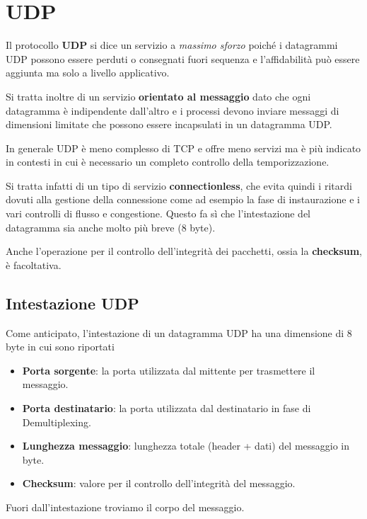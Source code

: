 \section{UDP}
Il protocollo \textbf{UDP} si dice un servizio a \emph{massimo sforzo} 
poiché i datagrammi UDP possono essere perduti o consegnati fuori 
sequenza e l'affidabilità può essere aggiunta ma solo a livello 
applicativo.

Si tratta inoltre di un servizio \textbf{orientato al messaggio} dato 
che ogni datagramma è indipendente dall'altro e i processi devono 
inviare messaggi di dimensioni limitate che possono essere incapsulati 
in un datagramma UDP.

In generale UDP è meno complesso di TCP e offre meno servizi ma è più 
indicato in contesti in cui è necessario un completo controllo della 
temporizzazione.

Si tratta infatti di un tipo di servizio \textbf{connectionless}, che 
evita quindi i ritardi dovuti alla gestione della connessione come ad 
esempio la fase di instaurazione e i vari controlli di flusso e 
congestione. Questo fa sì che l'intestazione del datagramma sia anche 
molto più breve (8 byte).

Anche l'operazione per il controllo dell'integrità dei pacchetti, ossia
la \textbf{checksum}, è facoltativa.

\subsection{Intestazione UDP}
Come anticipato, l'intestazione di un datagramma UDP ha una dimensione 
di 8 byte in cui sono riportati
\begin{itemize}
	\item \textbf{Porta sorgente}: la porta utilizzata dal mittente 
		per trasmettere il messaggio.
	\item \textbf{Porta destinatario}: la porta utilizzata dal 
		destinatario in fase di Demultiplexing.
	\item \textbf{Lunghezza messaggio}: lunghezza totale (header + 
		dati) del messaggio in byte.
	\item \textbf{Checksum}: valore per il controllo dell'integrità 
		del messaggio.
\end{itemize}
Fuori dall'intestazione troviamo il corpo del messaggio.

